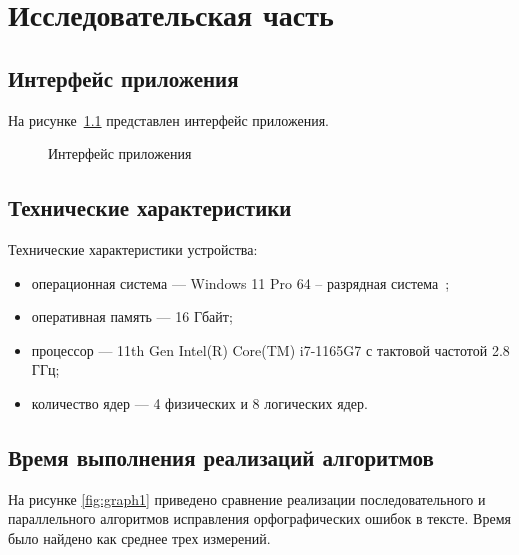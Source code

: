 \chapter{Исследовательская часть}

\section{Интерфейс приложения}

На рисунке~\ref{fig:interface} представлен интерфейс приложения.

\begin{figure}[h!]
	\caption{Интерфейс приложения}
	\label{fig:interface}
\end{figure}

\section{Технические характеристики}

Технические характеристики устройства:

\begin{itemize}
	\item операционная система --- Windows 11 Pro 64 -- разрядная система~\cite{windows};
	\item оперативная память --- 16 Гбайт;
	\item процессор --- 11th Gen Intel(R) Core(TM) i7-1165G7 с тактовой частотой 2.8 ГГц;
	\item количество ядер --- 4 физических и 8 логических ядер.
\end{itemize}

\section{Время выполнения реализаций алгоритмов}

На рисунке \ref{fig:graph1} приведено сравнение реализации последовательного и параллельного алгоритмов исправления орфографических ошибок в тексте. 
Время было найдено как среднее трех измерений.

